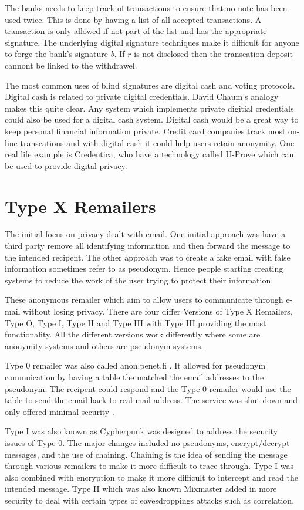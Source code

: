 \documentclass[12pt]{article}
\begin{document}
The banks needs to keep track of transactions to ensure that no note has been used twice. This is done by having a list of all accepted transactions. A transaction is only allowed if not part of the list and has the appropriate signature. The underlying digital signature techniques make it difficult for anyone to forge the bank's signature $\overline{b}$. If $r$ is not disclosed then the transcation deposit cannont be linked to the withdrawel\cite{Chaum}.

The most common uses of blind signatures are digital cash and voting protocols. Digital cash is related to private digital credentials. David Chaum's analogy makes this quite clear. Any system which implements private digitial credentials could also be used for a digital cash system. Digital cash would be a great way to keep personal financial information private. Credit card companies track most on-line transcations and with digital cash it could help users retain anonymity. One real life example is Credentica, who have a technology called U-Prove which can be used to provide digital privacy.

\section{Type X Remailers}\label{sec:type-x}
The initial focus on privacy dealt with email. One initial approach was have a third party remove all identifying information and then forward the message to the intended recipent. The other approach was to create a fake email with false information sometimes refer to as pseudonym. Hence people starting creating systems to reduce the work of the user trying to protect their information.

These anonymous remailer which aim to allow users to communicate through e-mail without losing privacy. There are four differ Versions of Type X Remailers, Type O, Type I, Type II and Type III with Type III providing the most functionality. All the different versions work differently where some are anonymity systems and others are pseudonym systems.

Type 0 remailer was also called anon.penet.fi \cite{GoldbertTwo}. It allowed for pseudonym commuication by having a table the matched the email addresses to the pseudonym. The recipent could respond and the Type 0 remailer would use the table to send the email back to real mail address. The service was shut down and only offered minimal security \cite{GoldbertTwo}.

Type I was also known as Cypherpunk was designed to address the security issues of Type 0. The major changes included no pseudonyms, encrypt/decrypt messages, and the use of chaining. Chaining is the idea of sending the message through various remailers to make it more difficult to trace through. Type I was also combined with encryption to make it more difficult to intercept and read the intended message. Type II which was also known  Mixmaster added in more security to deal with certain types of eavesdroppings attacks such as correlation. 
\end{document}
